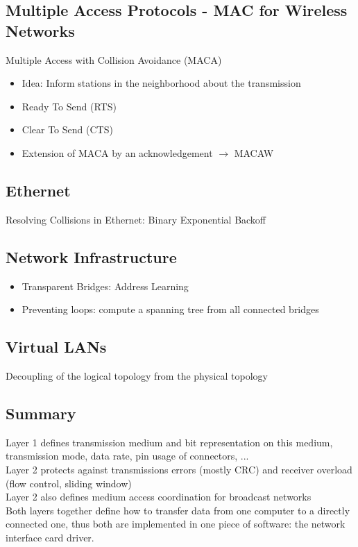 \documentclass[11pt,ngerman]{article}
\begin{document}
\subsection{Multiple	Access	Protocols - MAC	for	Wireless	Networks}
Multiple	Access	with	Collision	Avoidance	(MACA)
\begin{itemize}[noitemsep,nolistsep]
\item Idea:	Inform	stations	in	the	neighborhood	about	the	transmission
\item Ready	To	Send	(RTS)
\item Clear	To	Send	(CTS)
\item Extension	of	MACA	by	an	acknowledgement $\rightarrow$ MACAW
\end{itemize} 

\subsection{Ethernet}
Resolving	Collisions	in	Ethernet: Binary	Exponential	Backoff

\subsection{Network	Infrastructure}
\begin{itemize}[noitemsep,nolistsep]
\item Transparent	Bridges:	Address	Learning
\item Preventing	loops:	compute	a	
spanning	tree	from	all	connected	
bridges
\end{itemize}


\subsection{Virtual	LANs}
Decoupling	of	the	logical	topology from	the	physical	topology

\subsection{Summary}
Layer	1	defines	transmission	medium	and	bit	representation	on	this	medium, 
transmission	mode,	data	rate,	pin	usage	of	connectors,	...\\
Layer	2	protects	against	transmissions	errors	(mostly	CRC)	and	
receiver	overload	(flow	control,	sliding	window)\\
Layer	2	also	defines	medium	access	coordination	for	broadcast	networks\\
Both	layers	together	define	how	to	transfer	data	from	one	computer	to	a	
directly	connected	one,	thus	both	are	implemented	in	one	piece	of	
software:	the	network	interface	card	driver.
\end{document}
